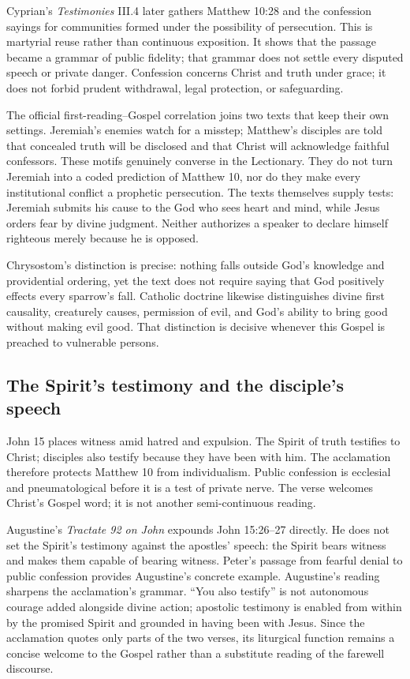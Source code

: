 Cyprian's \emph{Testimonies} III.4 later gathers Matthew 10:28 and the confession sayings for communities formed under the possibility of persecution. This is martyrial reuse rather than continuous exposition. It shows that the passage became a grammar of public fidelity; that grammar does not settle every disputed speech or private danger. Confession concerns Christ and truth under grace; it does not forbid prudent withdrawal, legal protection, or safeguarding.

The official first-reading--Gospel correlation joins two texts that keep their own settings. Jeremiah's enemies watch for a misstep; Matthew's disciples are told that concealed truth will be disclosed and that Christ will acknowledge faithful confessors. These motifs genuinely converse in the Lectionary. They do not turn Jeremiah into a coded prediction of Matthew 10, nor do they make every institutional conflict a prophetic persecution. The texts themselves supply tests: Jeremiah submits his cause to the God who sees heart and mind, while Jesus orders fear by divine judgment. Neither authorizes a speaker to declare himself righteous merely because he is opposed.

Chrysostom's distinction is precise: nothing falls outside God's knowledge and providential ordering, yet the text does not require saying that God positively effects every sparrow's fall. Catholic doctrine likewise distinguishes divine first causality, creaturely causes, permission of evil, and God's ability to bring good without making evil good. That distinction is decisive whenever this Gospel is preached to vulnerable persons.

\subsection*{The Spirit's testimony and the disciple's speech\enspace{}}

John 15 places witness amid hatred and expulsion. The Spirit of truth testifies to Christ; disciples also testify because they have been with him. The acclamation therefore protects Matthew 10 from individualism. Public confession is ecclesial and pneumatological before it is a test of private nerve. The verse welcomes Christ's Gospel word; it is not another semi-continuous reading.

Augustine's \emph{Tractate 92 on John} expounds John 15:26--27 directly. He does not set the Spirit's testimony against the apostles' speech: the Spirit bears witness and makes them capable of bearing witness. Peter's passage from fearful denial to public confession provides Augustine's concrete example. Augustine's reading sharpens the acclamation's grammar. “You also testify” is not autonomous courage added alongside divine action; apostolic testimony is enabled from within by the promised Spirit and grounded in having been with Jesus. Since the acclamation quotes only parts of the two verses, its liturgical function remains a concise welcome to the Gospel rather than a substitute reading of the farewell discourse.

